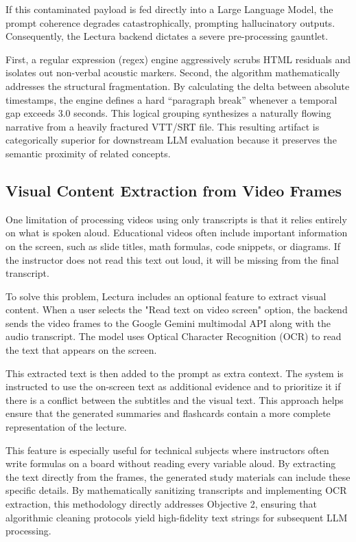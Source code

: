 If this contaminated payload is fed directly into a Large Language Model, the prompt coherence degrades catastrophically, prompting hallucinatory outputs. Consequently, the Lectura backend dictates a severe pre-processing gauntlet.

First, a regular expression (regex) engine aggressively scrubs HTML residuals and isolates out non-verbal acoustic markers. Second, the algorithm mathematically addresses the structural fragmentation. By calculating the delta between absolute timestamps, the engine defines a hard ``paragraph break'' whenever a temporal gap exceeds 3.0 seconds. This logical grouping synthesizes a naturally flowing narrative from a heavily fractured VTT/SRT file. This resulting artifact is categorically superior for downstream LLM evaluation because it preserves the semantic proximity of related concepts.

\subsection{Visual Content Extraction from Video Frames}
One limitation of processing videos using only transcripts is that it relies entirely on what is spoken aloud. Educational videos often include important information on the screen, such as slide titles, math formulas, code snippets, or diagrams. If the instructor does not read this text out loud, it will be missing from the final transcript.

To solve this problem, Lectura includes an optional feature to extract visual content. When a user selects the "Read text on video screen" option, the backend sends the video frames to the Google Gemini multimodal API along with the audio transcript. The model uses Optical Character Recognition (OCR) to read the text that appears on the screen.

This extracted text is then added to the prompt as extra context. The system is instructed to use the on-screen text as additional evidence and to prioritize it if there is a conflict between the subtitles and the visual text. This approach helps ensure that the generated summaries and flashcards contain a more complete representation of the lecture. 

This feature is especially useful for technical subjects where instructors often write formulas on a board without reading every variable aloud. By extracting the text directly from the frames, the generated study materials can include these specific details. By mathematically sanitizing transcripts and implementing OCR extraction, this methodology directly addresses Objective 2, ensuring that algorithmic cleaning protocols yield high-fidelity text strings for subsequent LLM processing.

